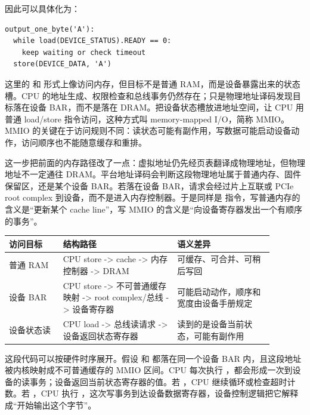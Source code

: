  因此可以具体化为：

\begin{lstlisting}
output_one_byte('A'):
  while load(DEVICE_STATUS).READY == 0:
    keep waiting or check timeout
  store(DEVICE_DATA, 'A')
\end{lstlisting}

这里的  和  形式上像访问内存，但目标不是普通 RAM，而是设备暴露出来的状态槽。CPU 的地址生成、权限检查和总线事务仍然存在；只是物理地址译码发现目标落在设备 BAR，而不是落在 DRAM。把设备状态槽放进地址空间，让 CPU 用普通 load/store 指令访问，这种方式叫 memory-mapped I/O，简称 MMIO。MMIO 的关键在于访问规则不同：读状态可能有副作用，写数据可能启动设备动作，访问顺序也不能随意缓存和重排。

这一步把前面的内存路径改了一点：虚拟地址仍先经页表翻译成物理地址，但物理地址不一定通往 DRAM。平台地址译码会判断这段物理地址属于普通内存、固件保留区，还是某个设备 BAR。若落在设备 BAR，请求会经过片上互联或 PCIe root complex 到设备，而不是进入内存控制器。于是同样是  指令，写普通内存的含义是“更新某个 cache line”，写 MMIO 的含义是“向设备寄存器发出一个有顺序的事务”。

\begin{longtable}{p{0.18\linewidth}p{0.38\linewidth}p{0.32\linewidth}}
\toprule
访问目标 & 结构路径 & 语义差异 \\
\midrule
普通 RAM & CPU store -> cache -> 内存控制器 -> DRAM & 可缓存、可合并、可稍后写回 \\
设备 BAR & CPU store -> 不可普通缓存映射 -> root complex/总线 -> 设备寄存器 & 可能启动动作，顺序和宽度由设备手册规定 \\
设备状态读 & CPU load -> 总线读请求 -> 设备返回状态寄存器 & 读到的是设备当前状态，可能有副作用 \\
\bottomrule
\end{longtable}

这段代码可以按硬件时序展开。假设  和  都落在同一个设备 BAR 内，且这段地址被内核映射成不可普通缓存的 MMIO 区间。CPU 每次执行 ，都会形成一次到设备的读事务；设备返回当前状态寄存器的值。若 ，CPU 继续循环或检查超时计数。若 ，CPU 执行 ，这次写事务到达设备数据寄存器，设备控制逻辑把它解释成“开始输出这个字节”。


